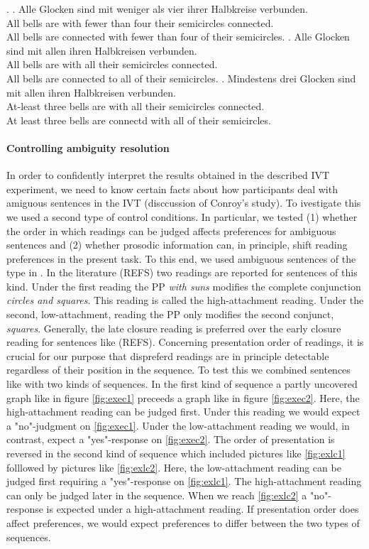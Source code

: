 \documentclass[a4paper,10pt]{article}
\begin{document}
\ex. \ag. Alle Glocken sind mit weniger als vier ihrer Halbkreise verbunden. \\
All bells are with fewer than four their semicircles connected.\\
All bells are connected with fewer than four of their semicircles.  
\bg. Alle Glocken sind mit allen ihren Halbkreisen verbunden.\\
All bells are with all their semicircles connected.\\
All bells are connected to all of their semicircles. 
\bg. Mindestens drei Glocken sind mit allen ihren Halbkreisen verbunden.\\
At-least three bells are with all  their semicircles connected.\\
At least three bells are connectd with all of their semicircles.



\paragraph{Controlling ambiguity resolution} In order to confidently interpret the results obtained in the described IVT experiment, we need to know certain facts about how participants deal with amiguous sentences in the IVT (disccussion of Conroy's study). To ivestigate this we used a second type of control conditions. In particular, we tested (1) whether the order in which readings can be judged affects preferences for ambiguous sentences and (2) whether prosodic information can, in principle, shift reading preferences in the present task. To this end, we used ambiguous sentences of the type in \Next. In the literature (REFS) two readings are reported for sentences of this kind. Under the first reading the PP {\it with suns} modifies the complete conjunction {\it circles and squares}. This reading is called the high-attachment reading. Under the second, low-attachment, reading the PP only modifies the second conjunct, {\it squares}. Generally, the late closure reading is preferred over the early closure reading for sentences like \Next (REFS). Concerning presentation order of readings, it is crucial for our purpose that dispreferd readings are in principle detectable regardless of their position in the sequence. To test this we combined sentences like \Next with two kinds of sequences. In the first kind of sequence a partly uncovered graph like in figure \ref{fig:exec1} preceeds a graph like in figure \ref{fig:exec2}. Here, the high-attachment reading can be judged first. Under this reading we would expect a "no"-judgment on \ref{fig:exec1}. Under the low-attachment reading we would, in contrast, expect a "yes"-response on \ref{fig:exec2}. The order of presentation is reversed in the second kind of sequence which included pictures like \ref{fig:exlc1} folllowed by pictures like \ref{fig:exlc2}. Here, the low-attachment reading can be judged first requiring a "yes"-response on \ref{fig:exlc1}. The high-attachment reading can only be judged later in the sequence. When we reach \ref{fig:exlc2} a "no"-response is expected under a high-attachment reading. If presentation order does affect preferences, we would expect preferences to differ between the two types of sequences. 
\end{document}
